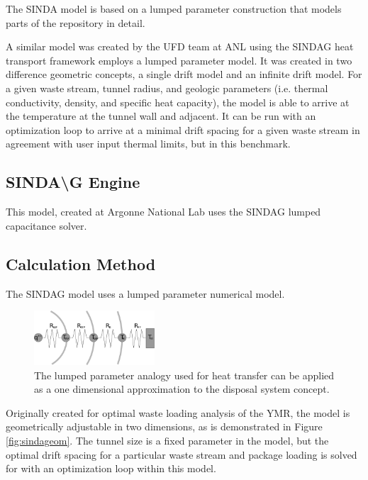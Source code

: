 \documentclass{anstrans}
\begin{document}
The SINDA model is based on a lumped parameter construction that models parts of 
the repository in detail. 

A similar model was created by the UFD team at \gls{ANL} using the \gls{SINDAG} 
heat transport framework employs a lumped parameter model. It was created in two  
difference geometric concepts, a single drift model and an infinite drift model.  
For a given waste stream, tunnel radius, and geologic parameters (i.e.  thermal 
conductivity, density, and specific heat capacity), the model is able to arrive  
at the temperature at the tunnel wall and adjacent. It can be run with an 
optimization loop to arrive at a minimal drift spacing for a given waste stream 
in agreement with user input thermal limits, but in this benchmark. 

\subsection{SINDA{\textbackslash}G Engine}

This model, created at Argonne National Lab  uses the \gls{SINDAG} lumped 
capacitance solver.  

\subsection{Calculation Method}

The \gls{SINDAG} model uses a lumped parameter numerical model.

\begin{figure}[h!]
  \begin{center}
    \includegraphics[width=0.4\textwidth]{lumpedParam.eps}
  \end{center}
  \caption{The lumped parameter analogy used for heat transfer can be applied as 
  a one dimensional approximation to the disposal system concept. }
  \label{fig:lumpedParam}
\end{figure}

Originally created for optimal waste loading analysis of the \gls{YMR}, the 
model is geometrically adjustable in two dimensions,  as is demonstrated in 
Figure \ref{fig:sindageom}. The tunnel size is a fixed parameter in the model, 
but the optimal drift spacing for a particular waste stream and package loading 
is solved for with an optimization loop within this model.
\end{document}
